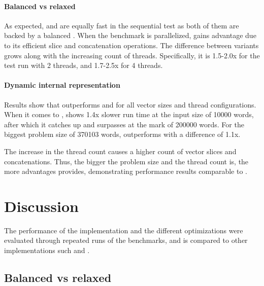 \paragraph{Balanced vs relaxed}
As expected, \rbvec{} and \rrbvec{} are equally fast in the sequential test as both of them are backed by a balanced \rbtree{}. When the benchmark is parallelized, \rrbvec{} gains advantage due to its efficient slice and concatenation operations. The difference between variants grows along with the increasing count of threads. Specifically, it is 1.5-2.0x for the test run with 2 threads, and 1.7-2.5x for 4 threads.

\paragraph{Dynamic internal representation}
Results show that \pvec{} outperforms \rbvec{} and \rrbvec{} for all vector sizes and thread configurations. When it comes to \stdvec{}, \pvec{} shows 1.4x slower run time at the input size of 10000 words, after which it catches up and surpasses \stdvec{} at the mark of 200000 words. For the biggest problem size of 370103 words, \pvec{} outperforms \stdvec{} with a difference of 1.1x. 

The increase in the thread count causes a higher count of vector slices and concatenations. Thus, the bigger the problem size and the thread count is, the more advantages \pvec{} provides, demonstrating performance results comparable to \stdvec{}. 

\section{Discussion}
The performance of the \rrbvec{} implementation and the different optimizations were evaluated through repeated runs of the benchmarks, and is compared to other implementations such \stdvec{} and \imrsvec{}. 



\subsection{Balanced vs relaxed}

